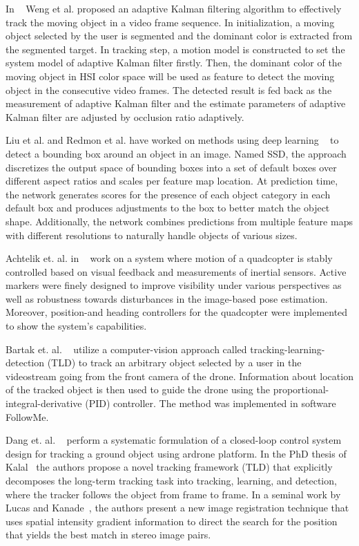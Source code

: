 In ~\cite{weng2006video} Weng et al. proposed an adaptive Kalman filtering algorithm to effectively track the moving object in a video frame sequence. In initialization, a moving object selected by the user is segmented and the dominant color is extracted from the segmented target. In tracking step, a motion model is constructed to set the system model of adaptive Kalman filter firstly. Then, the dominant color of the moving object in HSI color space will be used as feature to detect the moving object in the consecutive video frames. The detected result is fed back as the measurement of adaptive Kalman filter and the estimate parameters of adaptive Kalman filter are adjusted by occlusion ratio adaptively. 

Liu et al. and Redmon et al. have worked on methods using deep learning ~\cite{liu2016ssd,redmon2016you} to detect a bounding box around an object in an image. Named SSD, the approach discretizes the output space of bounding boxes into a set of default boxes over different aspect ratios and scales per feature map location. At prediction time, the network generates scores for the presence of each object category in each default box and produces adjustments to the box to better match the object shape. Additionally, the network combines predictions from multiple feature maps with different resolutions to naturally handle objects of various sizes.

Achtelik et. al. in ~\cite{achtelik2009visual} work on a system where motion of a quadcopter is stably controlled based on visual feedback and measurements of inertial sensors. Active markers were finely designed to improve visibility under various perspectives as well as robustness towards disturbances in the image-based pose estimation. Moreover, position-and heading controllers for the quadcopter were implemented to show the system's capabilities. 

Bartak et. al. ~\cite{bartak2015any} utilize a computer-vision approach called tracking-learning-detection (TLD) to track an arbitrary object selected by a user in the videostream going from the front camera of the drone. Information about location of the tracked object is then used to guide the drone using the proportional-integral-derivative (PID) controller. The method was implemented in software FollowMe.

Dang et. al. ~\cite{dang2013vision} perform a systematic formulation of a closed-loop control system design for tracking a ground object using ardrone platform. 
In the PhD thesis of Kalal~\cite{kalal2012tracking} the authors propose a novel tracking framework (TLD) that explicitly decomposes the long-term tracking task into tracking, learning, and detection, where the tracker follows the object from frame to frame. In a seminal work by
Lucas and Kanade~\cite{lucas1981iterative}, the authors present a new image registration technique that uses spatial intensity gradient information to direct the search for the position that yields the best match in stereo image pairs.